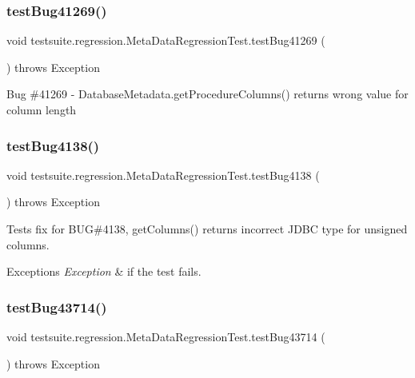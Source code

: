 \subsubsection{\texorpdfstring{test\+Bug41269()}{testBug41269()}}
{\footnotesize\ttfamily void testsuite.\+regression.\+Meta\+Data\+Regression\+Test.\+test\+Bug41269 (\begin{DoxyParamCaption}{ }\end{DoxyParamCaption}) throws Exception}

Bug \#41269 -\/ Database\+Metadata.\+get\+Procedure\+Columns() returns wrong value for column length \mbox{\label{classtestsuite_1_1regression_1_1_meta_data_regression_test_a5c0ea954c7204a811055ea0487e75862}} 
\subsubsection{\texorpdfstring{test\+Bug4138()}{testBug4138()}}
{\footnotesize\ttfamily void testsuite.\+regression.\+Meta\+Data\+Regression\+Test.\+test\+Bug4138 (\begin{DoxyParamCaption}{ }\end{DoxyParamCaption}) throws Exception}

Tests fix for B\+UG\#4138, get\+Columns() returns incorrect J\+D\+BC type for unsigned columns.


\begin{DoxyExceptions}{Exceptions}
{\em Exception} & if the test fails. \\
\hline
\end{DoxyExceptions}
\mbox{\label{classtestsuite_1_1regression_1_1_meta_data_regression_test_ab951e6884bbb864b56804cdbb096b57d}} 
\subsubsection{\texorpdfstring{test\+Bug43714()}{testBug43714()}}
{\footnotesize\ttfamily void testsuite.\+regression.\+Meta\+Data\+Regression\+Test.\+test\+Bug43714 (\begin{DoxyParamCaption}{ }\end{DoxyParamCaption}) throws Exception}

